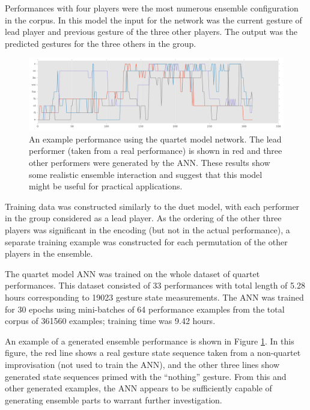 \documentclass{article}
\begin{document}
Performances with four players were the most numerous ensemble
configuration in the corpus. In this model the input for the network
was the current gesture of lead player and previous gesture of the
three other players. The output was the predicted gestures for the
three others in the group.

\begin{figure}
  \centering
  \includegraphics[width=\textwidth]{quartet-performance-512nodes-16}
  \caption{An example performance using the quartet model network. The
    lead performer (taken from a real performance) is shown in red and
    three other performers were generated by the ANN. These results
    show some realistic ensemble interaction and suggest that this
    model might be useful for practical
    applications.}\label{fig:quartet-model}
\end{figure}

Training data was constructed similarly to the duet model, with each
performer in the group considered as a lead player. As the ordering of
the other three players was significant in the encoding (but not in
the actual performance), a separate training example was constructed
for each permutation of the other players in the ensemble.

The quartet model ANN was trained on the whole dataset of quartet
performances. This dataset consisted of 33 performances with total
length of 5.28 hours corresponding to 19023 gesture state
measurements. The ANN was trained for 30 epochs using mini-batches of
64 performance examples from the total corpus of 361560 examples;
training time was 9.42 hours.

An example of a generated ensemble performance is shown in Figure
\ref{fig:quartet-model}. In this figure, the red line shows a real
gesture state sequence taken from a non-quartet improvisation (not
used to train the ANN), and the other three lines show generated state
sequences primed with the ``nothing'' gesture. From this and other
generated examples, the ANN appears to be sufficiently capable of
generating ensemble parts to warrant further investigation.
\end{document}
